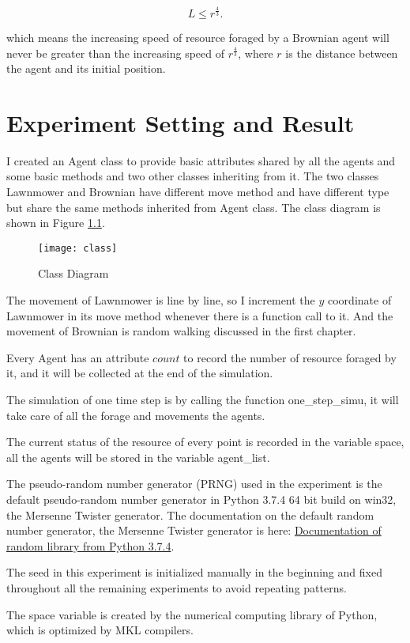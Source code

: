 \documentclass[a4paper, 12pt]{report}
\begin{document}
$$L\leq r^{\frac{4}{3}}.$$

which means the increasing speed of resource foraged by a Brownian agent will never be greater than the increasing speed of $r^{\frac{4}{3}}$, where $r$ is the distance between the agent and its initial position.

\chapter{Experiment Setting and Result}
I created an Agent class to provide basic attributes shared by all the agents and some basic methods and two other classes inheriting from it. The two classes Lawnmower and Brownian have different move method and have different type but share the same methods inherited from Agent class. The class diagram is shown in Figure \ref{cls}.
\begin{figure}[htp]
    \centering
    \texttt{[image: class]}
    \caption{Class Diagram}
    \label{cls}
\end{figure}
The movement of Lawnmower is line by line, so I increment the $y$ coordinate of Lawnmower in its move method whenever there is a function call to it. And the movement of Brownian is random walking discussed in the first chapter.

Every Agent has an attribute $count$ to record the number of resource foraged by it, and it will be collected at the end of the simulation.

The simulation of one time step is by calling the function one\_step\_simu, it will take care of all the forage and movements the agents.

The current status of the resource of every point is recorded in the variable space, all the agents will be stored in the variable agent\_list.

The pseudo-random number generator (PRNG) used in the experiment is the default pseudo-random number generator in Python 3.7.4 64 bit build on win32, the Mersenne Twister generator. The documentation on the default random number generator, the Mersenne Twister generator is here: \href{https://docs.python.org/3.7/library/random.html}{Documentation of random library from Python 3.7.4}.

The seed in this experiment is initialized manually in the beginning and fixed throughout all the remaining experiments to avoid repeating patterns.

The space variable is created by the numerical computing library of Python, which is optimized by MKL compilers.
\end{document}
